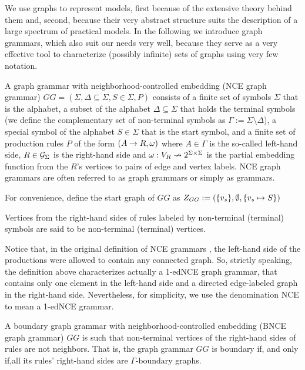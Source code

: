 \documentclass[]{report}
\begin{document}
We use graphs to represent models, first because of the extensive theory behind them and, second, because their very abstract structure suits the description of a large spectrum of practical models. In the following we introduce graph grammars, which also suit our needs very well, because they serve as a very effective tool to characterize (possibly infinite) sets of graphs using very few notation.

\begin{definition}
	\label{def:gg}
	A graph grammar with neighborhood-controlled embedding (NCE graph grammar) $GG = (\Sigma, \Delta \subseteq \Sigma, S \in \Sigma, P)$ consists of a finite set of symbols $\Sigma$ that is the alphabet, a subset of the alphabet $\Delta \subseteq \Sigma$ that holds the terminal symbols (we define the complementary set of non-terminal symbols as $\Gamma := \Sigma \setminus \Delta$), a special symbol of the alphabet $S \in \Sigma$ that is the start symbol, and a finite set of production rules $P$ of the form $(A \to R, \omega)$ where $A \in \Gamma$ is the so-called left-hand side, $R \in \mathcal{G}_{\Sigma}$ is the right-hand side and $\omega : V_R \nrightarrow 2^{\Sigma \times \Sigma}$ is the partial embedding function from the $R$'s vertices to pairs of edge and vertex labels. NCE graph grammars are often referred to as graph grammars or simply as grammars.
	
	For convenience, define the start graph of $GG$ as $Z_{GG} := (\{v_s\},\emptyset,\{v_s \mapsto S\})$
	
	Vertices from the right-hand sides of rules labeled by non-terminal (terminal) symbols are said to be non-terminal (terminal) vertices.
\end{definition}

Notice that, in the original definition of NCE grammars \cite{janssens1982graph}, the left-hand side of the productions were allowed to contain any connected graph. So, strictly speaking, the definition above characterizes actually a 1-edNCE graph grammar, that contains only one element in the left-hand side and a directed edge-labeled graph in the right-hand side. Nevertheless, for simplicity, we use the denomination NCE to mean a 1-edNCE grammar.

\begin{definition}
	A boundary graph grammar with neighborhood-controlled embedding (BNCE graph grammar) $GG$ is such that non-terminal vertices of the right-hand sides of rules are not neighbors. That is, the graph grammar $GG$ is boundary if, and only if,all its rules' right-hand sides are $\Gamma\text{-boundary}$ graphs.
\end{definition}
\end{document}
